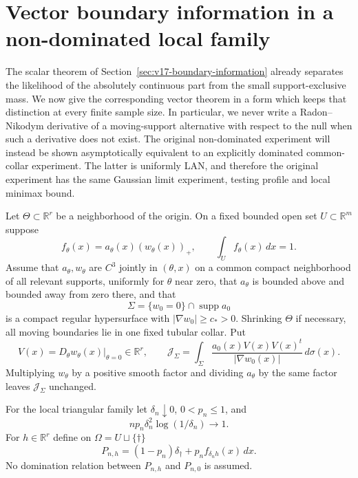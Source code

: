 \section{Vector boundary information in a non-dominated local family}
\label{sec:v21-vector-information}

The scalar theorem of Section~\ref{sec:v17-boundary-information} already
separates the likelihood of the absolutely continuous part from the small
support-exclusive mass.  We now give the corresponding vector theorem in a
form which keeps that distinction at every finite sample size.  In
particular, we never write a Radon--Nikodym derivative of a moving-support
alternative with respect to the null when such a derivative does not exist.
The original non-dominated experiment will instead be shown asymptotically
equivalent to an explicitly dominated common-collar experiment.  The latter
is uniformly LAN, and therefore the original experiment has the same
Gaussian limit experiment, testing profile and local minimax bound.

Let $\Theta\subset\mathbb R^r$ be a neighborhood of the origin.  On a fixed
bounded open set $U\subset\mathbb R^m$ suppose
\begin{equation}\label{eq:v21-vector-density}
 f_\theta(x)=a_\theta(x)(w_\theta(x))_+,
 \qquad \int_U f_\theta(x)\,dx=1.
\end{equation}
Assume that $a_\theta,w_\theta$ are $C^3$ jointly in $(\theta,x)$ on a
common compact neighborhood of all relevant supports, uniformly for
$\theta$ near zero, that $a_\theta$ is bounded above and bounded away from
zero there, and that
\[
 \Sigma=\{w_0=0\}\cap\operatorname{supp}a_0
\]
is a compact regular hypersurface with $|\nabla w_0|\ge c_*>0$.  Shrinking
$\Theta$ if necessary, all moving boundaries lie in one fixed tubular
collar.  Put
\begin{equation}\label{eq:v21-boundary-velocity-matrix}
 V(x)=D_\theta w_\theta(x)|_{\theta=0}\in\mathbb R^r,
 \qquad
 \mathcal J_\Sigma=
 \int_\Sigma\frac{a_0(x)V(x)V(x)^t}{|\nabla w_0(x)|}\,d\sigma(x).
\end{equation}
Multiplying $w_\theta$ by a positive smooth factor and dividing
$a_\theta$ by the same factor leaves $\mathcal J_\Sigma$ unchanged.

For the local triangular family let $\delta_n\downarrow0$, $0<p_n\le1$,
and
\begin{equation}\label{eq:v21-vector-rate}
 n p_n\delta_n^2\log(1/\delta_n)\longrightarrow1.
\end{equation}
For $h\in\mathbb R^r$ define on
$\Omega=U\sqcup\{\dagger\}$
\begin{equation}\label{eq:v21-thinned-family}
 P_{n,h}=(1-p_n)\delta_\dagger+p_nf_{\delta_nh}(x)\,dx.
\end{equation}
No domination relation between $P_{n,h}$ and $P_{n,0}$ is assumed.

